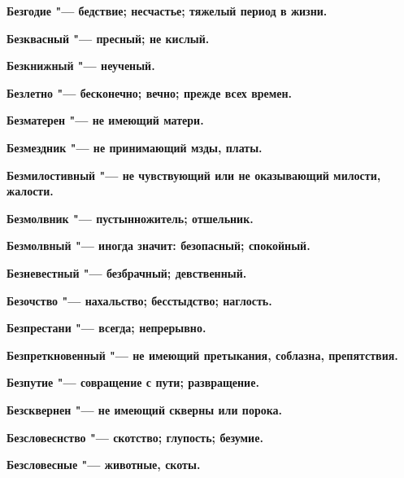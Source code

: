 \bfseries Безгодие \normalfont{} "--- бедствие; несчастье; тяжелый период в жизни. 




\bfseries Безквасный \normalfont{} "--- пресный; не кислый. 




\bfseries Безкнижный \normalfont{} "--- неученый. 




\bfseries Безлетно \normalfont{} "--- бесконечно; вечно; прежде всех времен. 




\bfseries Безматерен \normalfont{} "--- не имеющий матери. 




\bfseries Безмездник \normalfont{} "--- не принимающий мзды, платы. 




\bfseries Безмилостивный \normalfont{} "--- не чувствующий или не оказывающий милости, жалости. 




\bfseries Безмолвник \normalfont{} "--- пустынножитель; отшельник. 




\bfseries Безмолвный \normalfont{} "--- иногда значит: безопасный; спокойный. 




\bfseries Безневестный \normalfont{} "--- безбрачный; девственный. 




\bfseries Безочство \normalfont{} "--- нахальство; бесстыдство; наглость. 




\bfseries Безпрестани \normalfont{} "--- всегда; непрерывно. 




\bfseries Безпреткновенный \normalfont{} "--- не имеющий претыкания, соблазна, препятствия. 




\bfseries Безпутие \normalfont{} "--- совращение с пути; развращение. 




\bfseries Безсквернен \normalfont{} "--- не имеющий скверны или порока. 




\bfseries Безсловеснство \normalfont{} "--- скотство; глупость; безумие. 




\bfseries Безсловесные \normalfont{} "--- животные, скоты. 





